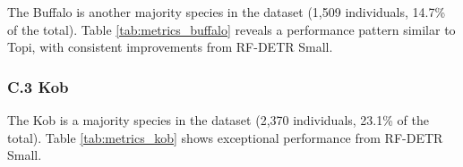 The Buffalo is another majority species in the dataset (1,509 individuals, 14.7\% of the total). Table \ref{tab:metrics_buffalo} reveals a performance pattern similar to Topi, with consistent improvements from RF-DETR Small.

\begin{table}[ht]
\centering
\caption{Performance metrics for the Buffalo species (Phase 2).}
\label{tab:metrics_buffalo}
\end{table}

\subsubsection*{C.3 Kob}

The Kob is a majority species in the dataset (2,370 individuals, 23.1\% of the total). Table \ref{tab:metrics_kob} shows exceptional performance from RF-DETR Small.

